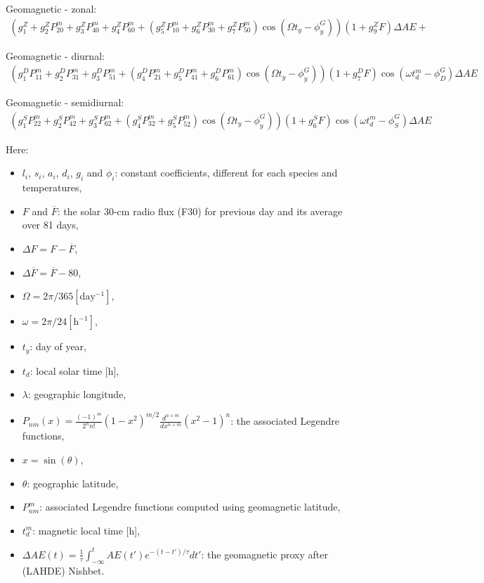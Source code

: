 \documentclass[referee,a4paper,12pt,traditabstract]{swsc}
\begin{document}
\begin{linenumbers}
Geomagnetic - zonal:
\begin{align*}
(g^Z_1+g^Z_2 P^m_{20}+g^Z_3 P^m_{40}+g^Z_4 P^m_{60} + (g^Z_5 P^m_{10}+g^Z_6 P^m_{30}+g^Z_7 P^m_{50})    \cos(\Omega t_y-\phi^G_y))(1+g^Z_9 F)\Delta AE +
\end{align*}

Geomagnetic - diurnal:
\begin{align*}
(g^D_1 P^m_{11}+g^D_2 P^m_{31}+g^D_3 P^m_{51} + (g^D_4 P^m_{21}+g^D_5 P^m_{41}+g^D_6 P^m_{61})    \cos(\Omega t_y-\phi^G_y))(1+g^D_7 F)\cos(\omega t^m_d-\phi^G_D)\Delta AE
\end{align*}

Geomagnetic - semidiurnal:
\begin{align*}
(g^S_1 P^m_{22}+g^S_2 P^m_{42}+g^S_3 P^m_{62} + (g^S_4 P^m_{32}+g^S_5 P^m_{52})\cos(\Omega t_y-\phi^G_y))(1+g^S_6 F)\cos(\omega t^m_d-\phi^G_S)\Delta AE
\end{align*}

Here:
\begin{itemize}
\item $l_i$, $s_i$, $a_i$, $d_i$, $g_i$ and $\phi_i$: constant coefficients, different for each species and temperatures,
\item $F$ and $\overline{F}$: the solar 30-cm radio flux (F30) for previous day and its average over 81 days,
\item $\Delta F = F - \overline{F}$,
\item $\Delta \overline{F} = \overline{F} - 80$,
\item $\Omega = 2\pi / 365 \mathrm{[day^{-1}]}$,
\item $\omega = 2\pi / 24 \mathrm{[h^{-1}]}$,
\item $t_y$: day of year,
\item $t_d$: local solar time [h],
\item $\lambda$: geographic longitude,
\item $P_{nm}(x) = \frac{(-1)^m}{2^n n!} (1-x^2)^{m/2} \frac{d^{n+m}}{d x^{n+m}} (x^2 - 1)^n$: the associated Legendre functions,
\item $x = \sin(\theta)$,
\item $\theta$: geographic latitude,
\item $P^m_{nm}$: associated Legendre functions computed using geomagnetic latitude,
\item $t^m_d$: magnetic local time [h],
\item $\Delta AE (t) = \frac{1}{\tau} \int_{-\infty}^{t} AE(t') e^{-(t-t')/\tau}dt'$: the geomagnetic proxy after (LAHDE) Nishbet.
\end{itemize}
 


\end{linenumbers}
\end{document}
